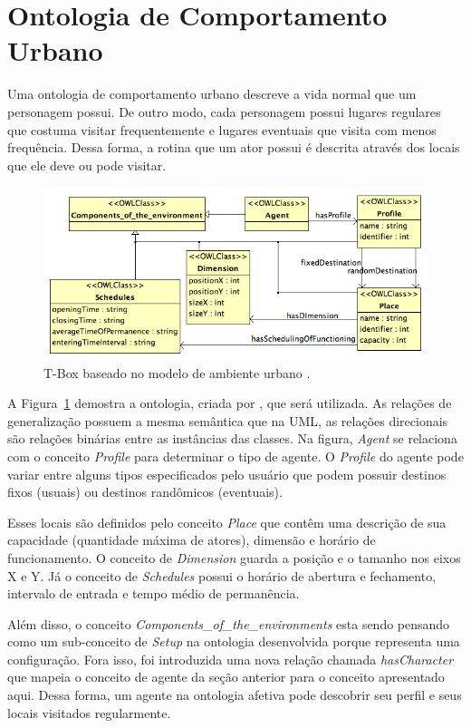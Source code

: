 \section{Ontologia de Comportamento Urbano} \label{ch:aec:ocu}

Uma ontologia de comportamento urbano descreve a vida normal que um personagem
possui. De outro modo, cada personagem possui lugares regulares que costuma
visitar frequentemente e lugares eventuais que visita com menos frequência.
Dessa forma, a rotina que um ator possui é descrita através dos locais que ele
deve ou pode visitar.

\begin{figure}
  \centering
    \includegraphics[width=150mm]{figuras/uem-tbox.png}
  \caption[T-Box baseado no modelo de ambiente urbano.]{T-Box baseado no modelo de ambiente urbano \cite{paiva2005ontology}.}
  \label{fig:UEM:TBOX}
\end{figure}

A Figura~\ref{fig:UEM:TBOX} demostra a ontologia, criada por
\citet{paiva2005ontology}, que será utilizada. As relações de generalização
possuem a mesma semântica que na UML, as relações direcionais são relações
binárias entre as instâncias das classes. Na figura, \emph{Agent} se relaciona
com o conceito \emph{Profile} para determinar o tipo de agente. O
\emph{Profile} do agente pode variar entre alguns tipos especificados pelo
usuário que podem possuir destinos fixos (usuais) ou destinos randômicos
(eventuais).

Esses locais são definidos pelo conceito \emph{Place} que contêm
uma descrição de sua capacidade (quantidade máxima de atores), dimensão
e horário de funcionamento. O conceito de \emph{Dimension} guarda a posição e
o tamanho nos eixos X e Y. Já o conceito de \emph{Schedules} possui o horário
de abertura e fechamento, intervalo de entrada e tempo médio de permanência.

Além disso, o conceito \emph{Components\_of\_the\_environments} esta sendo
pensando como um sub-conceito de \emph{Setup} na ontologia
desenvolvida porque representa uma configuração.
Fora isso, foi introduzida uma nova relação chamada \emph{hasCharacter} que
mapeia o conceito de agente da seção anterior para o conceito apresentado
aqui. Dessa forma, um agente na ontologia afetiva pode descobrir seu perfil e
seus locais visitados regularmente.

